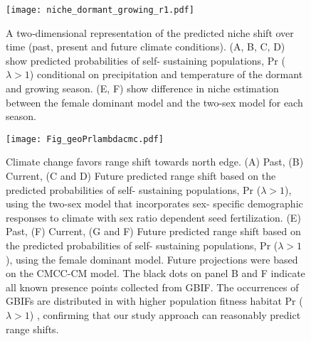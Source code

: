 \documentclass[9pt,twocolumn,twoside,lineno]{pnas-new}
\newcommand{\revise}[1]{{\color{Mahogany}{#1}}}
\begin{document}
\begin{figure}[H]
\centering
\texttt{[image: niche\_dormant\_growing\_r1.pdf]}
\caption{ A two‐dimensional representation of the predicted niche shift over time (past, present and future climate conditions). 
			(A, B, C, D)  show predicted probabilities of self- sustaining populations, Pr ($\lambda > 1$) conditional on precipitation and temperature of the dormant and growing season.
			(E, F) show difference in niche estimation between the female dominant model and the two-sex model for each season.
			\revise{The pink color indicates the female dominant (F) while the violet represents the two-sex models (FM).
			The dash line represents the mean probability for each model.}
			}
\label{fig:niche}
\end{figure}
\clearpage

\begin{figure}[H]
\centering
\texttt{[image: Fig\_geoPrlambdacmc.pdf]}
\caption{ Climate change favors range shift towards north edge.
			(A) Past, (B) Current, (C and D) Future predicted range shift based on the predicted probabilities of self- sustaining populations, Pr ($\lambda > 1$), using the two-sex model that incorporates sex- specific demographic responses to climate with sex ratio dependent seed fertilization.
			(E) Past, (F) Current, (G and F) Future  predicted range shift based on the predicted probabilities of self- sustaining populations, Pr ($\lambda > 1$), using the female dominant model.
			Future projections were based on the CMCC-CM model.
			The black dots on panel B and F indicate all known presence points collected from GBIF. 
			The occurrences of GBIFs are distributed in with higher population fitness habitat Pr ($\lambda > 1$) , confirming that our study approach can reasonably predict range shifts. 
			}
\label{fig:geoprojcmc}
\end{figure}
\end{document}
